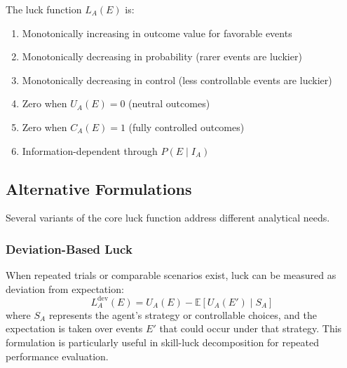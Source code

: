 \begin{proposition}
  The luck function $L_{A}(E)$ is:
  \begin{enumerate}
    \item Monotonically increasing in outcome value for favorable events

    \item Monotonically decreasing in probability (rarer events are
      luckier)

    \item Monotonically decreasing in control (less controllable events
      are luckier)

    \item Zero when $U_{A}(E) = 0$ (neutral outcomes)

    \item Zero when $C_{A}(E) = 1$ (fully controlled outcomes)

    \item Information-dependent through $P(E \mid I_{A})$
  \end{enumerate}
\end{proposition}

\subsection{Alternative Formulations}

Several variants of the core luck function address different analytical
needs.

\subsubsection{Deviation-Based Luck}

When repeated trials or comparable scenarios exist, luck can be measured
as deviation from expectation:
\begin{equation}
  L_{A}^{\text{dev}}(E) = U_{A}(E) - \mathbb{E}[U_{A}(E') \mid S_{A}]
\end{equation}
where $S_{A}$ represents the agent's strategy or controllable choices,
and the expectation is taken over events $E'$ that could occur under
that strategy. This formulation is particularly useful in skill-luck decomposition
for repeated performance evaluation.

